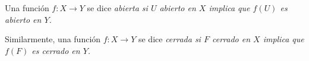 
\begin{definition}
Una función $f : X \longrightarrow Y$ se dice \itshape{abierta} si $U$ abierto en $X$ implica que $f(U)$ es abierto en $Y$.
\end{definition}

\begin{definition}
Similarmente, una función $f : X \longrightarrow Y$ se dice \itshape{cerrada} si $F$ cerrado en $X$ implica que $f(F)$ es cerrado en $Y$.
\end{definition}
